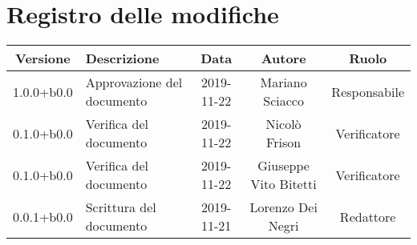 \section*{Registro delle modifiche}

\begin{center}
	\begin{longtable}{|c|p{3cm}|c|c|c|}
	\hline
	\rowcolor{lighter-grayer}
	\textbf{Versione} & \textbf{Descrizione} & \textbf{Data} & \textbf{Autore} & \textbf{Ruolo} \\
	\hline
	\endfirsthead


	1.0.0+b0.0 & Approvazione del documento & 2019-11-22 & Mariano Sciacco & Responsabile \\
	\hline
	0.1.0+b0.0 & Verifica del documento & 2019-11-22 & Nicolò Frison & Verificatore \\
	\hline
	0.1.0+b0.0 & Verifica del documento & 2019-11-22 & Giuseppe Vito Bitetti & Verificatore \\
	\hline
	0.0.1+b0.0 & Scrittura del documento & 2019-11-21 & Lorenzo Dei Negri & Redattore \\

	\hline

	\end{longtable}
\end{center}

